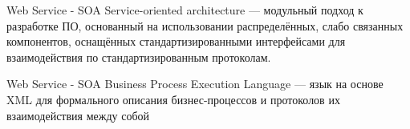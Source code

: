 \begin{frame}{Web Service - SOA}
Service-oriented architecture — модульный подход к разработке ПО, основанный на использовании распределённых, слабо связанных компонентов, оснащённых стандартизированными интерфейсами для взаимодействия по стандартизированным протоколам.
\end{frame}

\begin{frame}{Web Service - SOA}
Business Process Execution Language — язык на основе XML для формального описания бизнес-процессов и протоколов их взаимодействия между собой
\end{frame}


